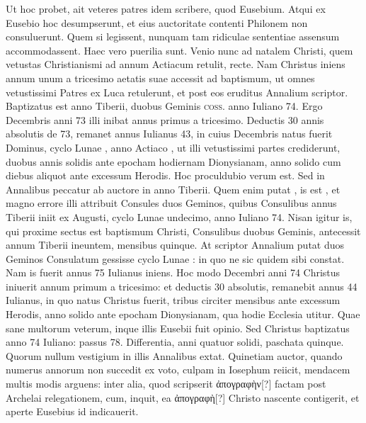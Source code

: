Ut hoc probet, ait
veteres patres idem scribere, quod Eusebium.
Atqui ex Eusebio
hoc desumpserunt, et eius auctoritate contenti Philonem non consuluerunt.
Quem si legissent, nunquam tam ridiculae sententiae assensum
accommodassent.
Haec vero puerilia sunt.
Venio nunc ad natalem
Christi, quem vetustas Christianismi ad  annum Actiacum
retulit, recte.
Nam Christus iniens annum unum a tricesimo
aetatis suae accessit ad baptismum, ut omnes vetustissimi Patres ex
Luca retulerunt, et post eos eruditus Annalium scriptor.
Baptizatus est anno  Tiberii, duobus Geminis
 \textsc{coss}. anno Iuliano 74.
Ergo  Decembris anni 73 illi inibat annus
 primus a tricesimo.
Deductis 30 annis absolutis de 73, remanet annus Iulianus
43, in cuius  Decembris natus fuerit Dominus, cyclo Lunae
, anno Actiaco ,
 ut illi vetustissimi partes crediderunt,
duobus annis solidis ante epocham hodiernam Dionysianam,
anno solido cum diebus aliquot ante excessum Herodis.
Hoc proculdubio
verum est.
Sed in Annalibus peccatur ab auctore in anno
 Tiberii.
Quem enim putat , is est , et magno errore illi
attribuit Consules duos Geminos, quibus Consulibus annus 
Tiberii iniit ex  Augusti, cyclo Lunae undecimo, anno Iuliano
74.
Nisan igitur is, qui proxime sectus est baptismum Christi,
Consulibus duobus Geminis, antecessit annum  Tiberii ineuntem,
mensibus quinque.
At scriptor Annalium putat duos Geminos
Consulatum gessisse cyclo Lunae : in quo ne sic quidem
sibi constat.
%
Nam is fuerit annus 75 Iulianus iniens.
Hoc modo Decembri anni 74 Christus iniuerit annum primum a tricesimo: et
deductis 30 absolutis, remanebit annus 44 Iulianus, in quo natus
Christus fuerit, tribus circiter mensibus ante excessum Herodis, anno
solido ante epocham Dionysianam, qua hodie Ecclesia utitur.
Quae sane multorum veterum, inque illis Eusebii fuit opinio.
Sed
Christus baptizatus anno 74 Iuliano: passus 78.
Differentia, anni
quatuor solidi, paschata quinque.
Quorum nullum vestigium in illis
Annalibus extat.
Quinetiam auctor, quando numerus annorum
non succedit ex voto, culpam in Iosephum reiicit, mendacem multis
modis arguens: inter alia, quod scripserit \textgreek{ἀπογραφὴν[?]} factam post
Archelai relegationem, cum, inquit, ea \textgreek{ἀπογραφὴ[?]} Christo nascente
contigerit, et aperte Eusebius id indicauerit.
